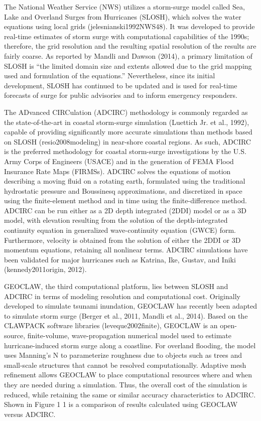 The National Weather Service (NWS) utilizes a storm-surge model called Sea, Lake and Overland Surges from Hurricanes (SLOSH), which solves the water equations using local grids (jelesnianski1992NWS48). It was developed to provide real-time estimates of storm surge with computational capabilities of the 1990s; therefore, the grid resolution and the resulting spatial resolution of the results are fairly coarse. As reported by Mandli and Dawson (2014), a primary limitation of SLOSH is “the limited domain size and extents allowed due to the grid mapping used and formulation of the equations.” Nevertheless, since its initial development, SLOSH has continued to be updated and is used for real-time forecasts of surge for public advisories and to inform emergency responders.

The ADvanced CIRCulation (ADCIRC) methodology is commonly regarded as the state-of-the-art in coastal storm-surge simulation (Luettich Jr. et al., 1992), capable of providing significantly more accurate simulations than methods based on SLOSH (resio2008modeling) in near-shore coastal regions. As such, ADCIRC is the preferred methodology for coastal storm-surge investigations by the U.S. Army Corps of Engineers (USACE) and in the generation of FEMA Flood Insurance Rate Maps (FIRMSs). ADCIRC solves the equations of motion describing a moving fluid on a rotating earth, formulated using the traditional hydrostatic pressure and Boussinesq approximations, and discretized in space using the finite-element method and in time using the finite-difference method. ADCIRC can be run either as a 2D depth integrated (2DDI) model or as a 3D model, with elevation resulting from the solution of the depth-integrated continuity equation in generalized wave-continuity equation (GWCE) form. Furthermore, velocity is obtained from the solution of either the 2DDI or 3D momentum equations, retaining all nonlinear terms. ADCIRC simulations have been validated for major hurricanes such as Katrina, Ike, Gustav, and Iniki (kennedy2011origin, 2012). 

GEOCLAW, the third computational platform, lies between SLOSH and ADCIRC in terms of modeling resolution and computational cost. Originally developed to simulate tsunami inundation, GEOCLAW has recently been adapted to simulate storm surge (Berger et al., 2011, Mandli et al., 2014). Based on the CLAWPACK software libraries (leveque2002finite), GEOCLAW is an open-source, finite-volume, wave-propagation numerical model used to estimate hurricane-induced storm surge along a coastline. For overland flooding, the model uses Manning's N to parameterize roughness due to objects such as trees and small-scale structures that cannot be resolved computationally. Adaptive mesh refinement allows GEOCLAW to place computational resources where and when they are needed during a simulation. Thus, the overall cost of the simulation is reduced, while retaining the same or similar accuracy characteristics to ADCIRC. Shown in Figure 1 1 is a comparison of results calculated using GEOCLAW versus ADCIRC. 
\newline

